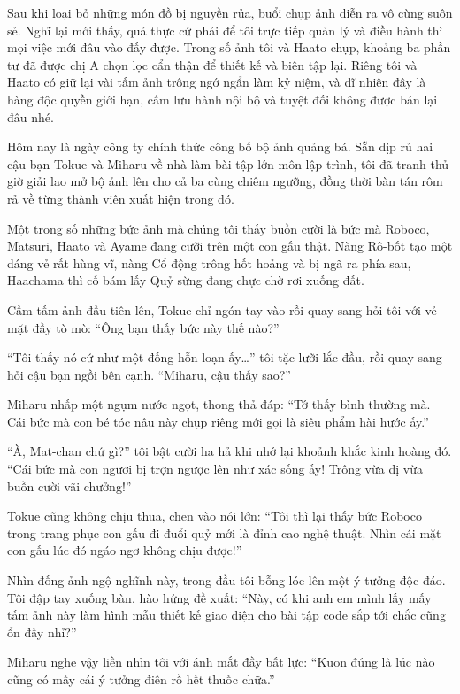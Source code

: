 \documentclass[../main.tex]{subfiles}
\begin{document}
Sau khi loại bỏ những món đồ bị nguyền rủa, buổi chụp ảnh diễn ra vô cùng suôn sẻ. Nghĩ lại mới thấy, quả thực cứ phải để tôi trực tiếp quản lý và điều hành thì mọi việc mới đâu vào đấy được. Trong số ảnh tôi và Haato chụp, khoảng ba phần tư đã được chị A chọn lọc cẩn thận để thiết kế và biên tập lại. Riêng tôi và Haato có giữ lại vài tấm ảnh trông ngớ ngẩn làm kỷ niệm, và dĩ nhiên đây là hàng độc quyền giới hạn, cấm lưu hành nội bộ và tuyệt đối không được bán lại đâu nhé.

Hôm nay là ngày công ty chính thức công bố bộ ảnh quảng bá. Sẵn dịp rủ hai cậu bạn Tokue và Miharu về nhà làm bài tập lớn môn lập trình, tôi đã tranh thủ giờ giải lao mở bộ ảnh lên cho cả ba cùng chiêm ngưỡng, đồng thời bàn tán rôm rả về từng thành viên xuất hiện trong đó.


Một trong số những bức ảnh mà chúng tôi thấy buồn cười là bức mà Roboco, Matsuri, Haato và Ayame đang cưỡi trên một con gấu thật. Nàng Rô-bốt tạo một dáng vẻ rất hùng vĩ, nàng Cổ động trông hốt hoảng và bị ngã ra phía sau, Haachama thì cố bám lấy Quỷ sừng đang chực chờ rơi xuống đất.

Cầm tấm ảnh đầu tiên lên, Tokue chỉ ngón tay vào rồi quay sang hỏi tôi với vẻ mặt đầy tò mò: ``Ông bạn thấy bức này thế nào?''

``Tôi thấy nó cứ như một đống hỗn loạn ấy\dots'' tôi tặc lưỡi lắc đầu, rồi quay sang hỏi cậu bạn ngồi bên cạnh. ``Miharu, cậu thấy sao?''

Miharu nhấp một ngụm nước ngọt, thong thả đáp: ``Tớ thấy bình thường mà. Cái bức mà con bé tóc nâu này chụp riêng mới gọi là siêu phẩm hài hước ấy.''

``À, Mat-chan chứ gì?'' tôi bật cười ha hả khi nhớ lại khoảnh khắc kinh hoàng đó. ``Cái bức mà con ngươi bị trợn ngược lên như xác sống ấy! Trông vừa dị vừa buồn cười vãi chưởng!''

Tokue cũng không chịu thua, chen vào nói lớn: ``Tôi thì lại thấy bức Roboco trong trang phục con gấu đi đuổi quỷ mới là đỉnh cao nghệ thuật. Nhìn cái mặt con gấu lúc đó ngáo ngơ không chịu được!''

Nhìn đống ảnh ngộ nghĩnh này, trong đầu tôi bỗng lóe lên một ý tưởng độc đáo. Tôi đập tay xuống bàn, hào hứng đề xuất:
``Này, có khi anh em mình lấy mấy tấm ảnh này làm hình mẫu thiết kế giao diện cho bài tập code sắp tới chắc cũng ổn đấy nhỉ?''

Miharu nghe vậy liền nhìn tôi với ánh mắt đầy bất lực: ``Kuon đúng là lúc nào cũng có mấy cái ý tưởng điên rồ hết thuốc chữa.''
\end{document}
